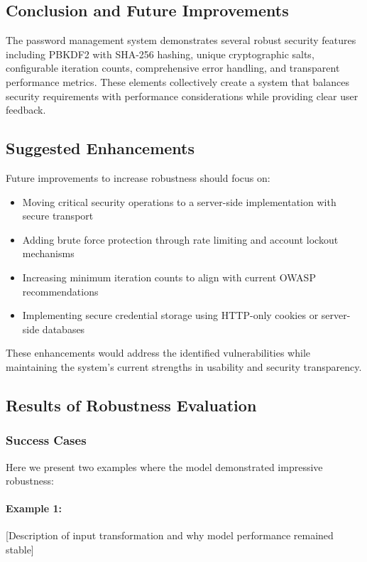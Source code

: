 \documentclass[11pt,a4paper]{article}
\begin{document}
\subsection{Conclusion and Future Improvements}

The password management system demonstrates several robust security features including PBKDF2 with SHA-256 hashing, unique cryptographic salts, configurable iteration counts, comprehensive error handling, and transparent performance metrics. These elements collectively create a system that balances security requirements with performance considerations while providing clear user feedback.

\subsection{Suggested Enhancements}
Future improvements to increase robustness should focus on:
\begin{itemize}
   \item Moving critical security operations to a server-side implementation with secure transport
   \item Adding brute force protection through rate limiting and account lockout mechanisms
   \item Increasing minimum iteration counts to align with current OWASP recommendations
   \item Implementing secure credential storage using HTTP-only cookies or server-side databases
\end{itemize}

These enhancements would address the identified vulnerabilities while maintaining the system's current strengths in usability and security transparency.

\subsection{Results of Robustness Evaluation}


\subsubsection{Success Cases}

Here we present two examples where the model demonstrated impressive robustness:

\paragraph{Example 1:} [Description of input transformation and why model performance remained stable]
\end{document}
